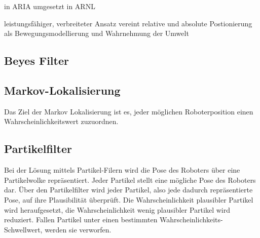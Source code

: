 \documentclass{article}
\begin{document}
in ARIA umgesetzt in ARNL

leistungsfähiger, verbreiteter Ansatz
vereint relative und absolute Postionierung als
 Bewegungsmodellierung und Wahrnehmung der Umwelt

\subsection{Beyes Filter}
\subsection{Markov-Lokalisierung}
Das Ziel der Markov Lokalisierung ist es, jeder möglichen Roboterposition einen
Wahrscheinlichkeitswert zuzuordnen.
\subsection{Partikelfilter}
Bei der Lösung mittels Partikel-Filern wird die Pose des Roboters über eine Partikelwolke repräsentiert. Jeder Partikel stellt eine mögliche Pose des Roboters dar. Über den Partikelfilter wird jeder Partikel, also jede dadurch repräsentierte Pose, auf ihre Plausibilität überprüft. Die Wahrscheinlichkeit plausibler Partikel wird heraufgesetzt, die Wahrscheinlichkeit wenig plausibler Partikel wird reduziert. Fallen Partikel unter einen bestimmten Wahrscheinlichkeits-Schwellwert, werden sie verworfen.
\end{document}

